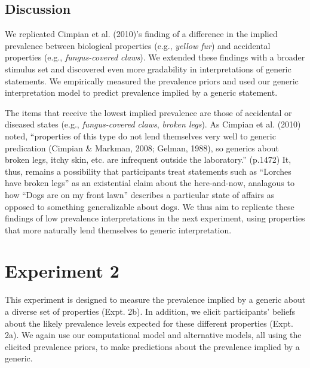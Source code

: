 \documentclass[floatsintext,doc]{apa6}
\theoremstyle{definition}
\theoremstyle{definition}
\theoremstyle{definition}
\theoremstyle{remark}
\begin{document}
\subsection{Discussion}\label{discussion}

We replicated Cimpian et al. (2010)'s finding of a difference in the
implied prevalence between biological properties (e.g., \emph{yellow
fur}) and accidental properties (e.g., \emph{fungus-covered claws}). We
extended these findings with a broader stimulus set and discovered even
more gradability in interpretations of generic statements. We
empirically measured the prevalence priors and used our generic
interpretation model to predict prevalence implied by a generic
statement.


The items that receive the lowest implied prevalence are those of
accidental or diseased states (e.g., \emph{fungus-covered claws},
\emph{broken legs}). As Cimpian et al. (2010) noted, \enquote{properties
of this type do not lend themselves very well to generic predication
(Cimpian \& Markman, 2008; Gelman, 1988), so generics about broken legs,
itchy skin, etc. are infrequent outside the laboratory.} (p.1472) It,
thus, remains a possibility that participants treat statements such as
\enquote{Lorches have broken legs} as an existential claim about the
here-and-now, analagous to how \enquote{Dogs are on my front lawn}
describes a particular state of affairs as opposed to something
generalizable about dogs. We thus aim to replicate these findings of low
prevalence interpretations in the next experiment, using properties that more naturally lend
themselves to generic interpretation.

\section{Experiment 2}\label{experiment-2}

This experiment is designed to measure the prevalence implied by a
generic about a diverse set of properties (Expt. 2b). In addition, we
elicit participants' beliefs about the likely prevalence levels expected
for these different properties (Expt. 2a). We again use our computational
model and alternative models, all using the elicited prevalence
priors, to make predictions about the prevalence implied by a generic.
\end{document}
